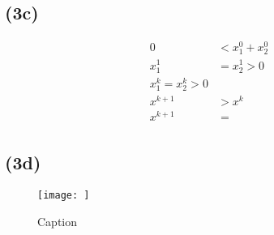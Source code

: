 \documentclass{article}
\begin{document}
\subsection*{(3c)}

\begin{align*}
    0 &< x_1^0 + x_2^0 \\
    x_1^1 &= x_2^1 > 0 \\
    x_1^k = x_2^k >0\\
    x^{k+1} &> x^k \\
    x^{k+1} &= \frac{}{}
\end{align*}

\subsection*{(3d)}

\begin{figure}
    \centering
    \texttt{[image: ]}
    \caption{Caption}
    \label{fig:my_label}
\end{figure}
\end{document}

